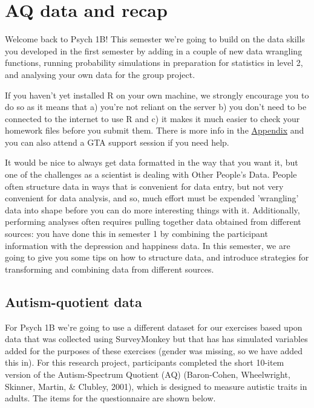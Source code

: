 \documentclass[
  oneside]{book}
\begin{document}
\hypertarget{aq-data-and-recap}{%
\chapter{AQ data and recap}\label{aq-data-and-recap}}

Welcome back to Psych 1B! This semester we're going to build on the data skills you developed in the first semester by adding in a couple of new data wrangling functions, running probability simulations in preparation for statistics in level 2, and analysing your own data for the group project.

\begin{info}
If you haven't yet installed R on your own machine, we strongly
encourage you to do so as it means that a) you're not reliant on the
server b) you don't need to be connected to the internet to use R and c)
it makes it much easier to check your homework files before you submit
them. There is more info in the
\href{https://psyteachr.github.io/ug1-practical/installing-r-on-your-computer-1.html}{Appendix}
and you can also attend a GTA support session if you need help.
\end{info}

It would be nice to always get data formatted in the way that you want it, but one of the challenges as a scientist is dealing with Other People's Data. People often structure data in ways that is convenient for data entry, but not very convenient for data analysis, and so, much effort must be expended 'wrangling' data into shape before you can do more interesting things with it. Additionally, performing analyses often requires pulling together data obtained from different sources: you have done this in semester 1 by combining the participant information with the depression and happiness data. In this semester, we are going to give you some tips on how to structure data, and introduce strategies for transforming and combining data from different sources.

\hypertarget{autism-quotient-data}{%
\section{Autism-quotient data}\label{autism-quotient-data}}

For Psych 1B we're going to use a different dataset for our exercises based upon data that was collected using SurveyMonkey but that has has simulated variables added for the purposes of these exercises (gender was missing, so we have added this in). For this research project, participants completed the short 10-item version of the Autism-Spectrum Quotient (AQ) (Baron-Cohen, Wheelwright, Skinner, Martin, \& Clubley, 2001), which is designed to measure autistic traits in adults. The items for the questionnaire are shown below.
\end{document}
